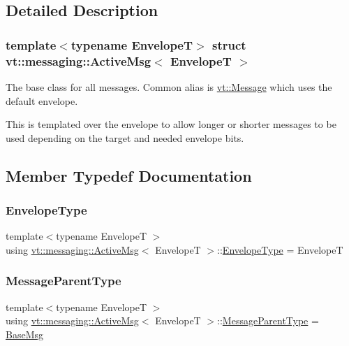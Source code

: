\subsection{Detailed Description}
\subsubsection*{template$<$typename EnvelopeT$>$\newline
struct vt\+::messaging\+::\+Active\+Msg$<$ Envelope\+T $>$}

The base class for all messages. Common alias is {\ttfamily \hyperlink{namespacevt_a3a3ddfef40b4c90915fa43cdd5f129ea}{vt\+::\+Message}} which uses the default envelope. 

This is templated over the envelope to allow longer or shorter messages to be used depending on the target and needed envelope bits. 

\subsection{Member Typedef Documentation}
\mbox{\label{structvt_1_1messaging_1_1_active_msg_a6e2b0541c25f7290555bf50d7cc05874}} 
\subsubsection{\texorpdfstring{Envelope\+Type}{EnvelopeType}}
{\footnotesize\ttfamily template$<$typename EnvelopeT $>$ \\
using \hyperlink{structvt_1_1messaging_1_1_active_msg}{vt\+::messaging\+::\+Active\+Msg}$<$ EnvelopeT $>$\+::\hyperlink{structvt_1_1messaging_1_1_active_msg_a6e2b0541c25f7290555bf50d7cc05874}{Envelope\+Type} =  EnvelopeT}

\mbox{\label{structvt_1_1messaging_1_1_active_msg_ac2e6d93267991027ce78c968b17064c7}} 
\subsubsection{\texorpdfstring{Message\+Parent\+Type}{MessageParentType}}
{\footnotesize\ttfamily template$<$typename EnvelopeT $>$ \\
using \hyperlink{structvt_1_1messaging_1_1_active_msg}{vt\+::messaging\+::\+Active\+Msg}$<$ EnvelopeT $>$\+::\hyperlink{structvt_1_1messaging_1_1_active_msg_ac2e6d93267991027ce78c968b17064c7}{Message\+Parent\+Type} =  \hyperlink{structvt_1_1messaging_1_1_base_msg}{Base\+Msg}}



